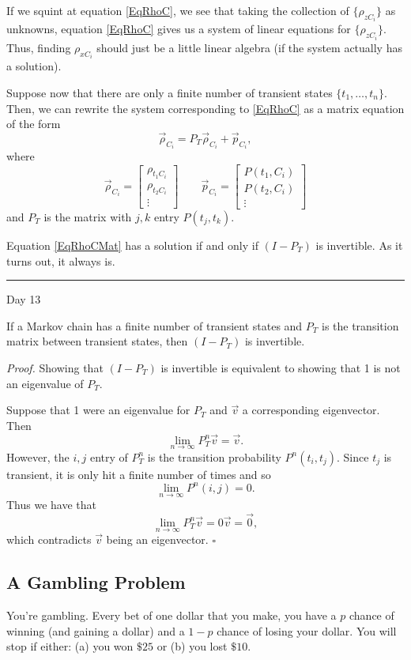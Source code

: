 \documentclass{problemset}
\newcommand{\mat}[1]{\begin{bmatrix}#1\end{bmatrix}}
\newcommand{\1}{\mathbf{1}}
\renewcommand{\P}{\mathbb{P}}
\newcommand{\fatrule}[1]{\vspace{.3cm}\hrule {\hfill \sf #1}\par}
\newenvironment{proof}{\emph{Proof.}}{\hfill$\square$}
\begin{document}
	If we squint at equation \eqref{EqRhoC}, we see that taking the collection of $\{\rho_{zC_i}\}$
	as unknowns, equation \eqref{EqRhoC} gives us a system of linear equations for $\{\rho_{zC_i}\}$.
	Thus, finding $\rho_{xC_i}$ should just be a little linear algebra (if the system actually has a solution).

	Suppose now that there are only a finite number of transient states $\{t_1,\ldots, t_n\}$.  Then, we can rewrite the
	system corresponding to \eqref{EqRhoC} as a matrix equation of the form
	\begin{equation}
		\label{EqRhoCMat}
		\vec \rho_{C_i} = P_T \vec \rho_{C_i} + \vec p_{C_i},
	\end{equation}
	where 
	\[
		\vec \rho_{C_i} = \mat{\rho_{t_1C_i}\\ \rho_{t_2C_i}\\\vdots}
		\qquad \vec p_{C_i} = \mat{P(t_1,C_i)\\P(t_2,C_i)\\\vdots}
	\]
	and $P_T$ is the matrix with $j,k$ entry $P(t_j,t_k)$.

	Equation \eqref{EqRhoCMat} has a solution if and only if $(I-P_T)$ is invertible.  As it turns
	out, it always is.

	\fatrule{Day 13}
	\begin{theorem}
		If a Markov chain has a finite number of transient states and $P_T$ is the transition
		matrix between transient states, then $(I-P_T)$ is invertible.
	\end{theorem}
	\begin{proof}
		Showing that $(I-P_T)$ is invertible is equivalent to showing that 1 is not an
		eigenvalue of $P_T$.

		Suppose that 1 were an eigenvalue for $P_T$ and $\vec v$ a corresponding eigenvector.
		Then
		\[
			\lim_{n\to\infty} P_T^n\vec v = \vec v.
		\]
		However, the $i,j$ entry of $P_T^n$ is the transition probability $P^n(t_i,t_j)$.
		Since $t_j$ is transient, it is only hit a finite number of times and so
		\[
			\lim_{n\to\infty} P^n(i,j) = 0.
		\]
		Thus we have that 
		\[
			\lim_{n\to\infty} P_T^n\vec v = 0\vec v=\vec 0,
		\]
		which contradicts $\vec v$ being an eigenvector.
	\end{proof}


\subsection*{A Gambling Problem}

	You're gambling. Every bet of one dollar that you make, you have a $p$ chance of winning
	(and gaining a dollar) and a $1-p$ chance of losing your dollar.  You will stop if either: (a)
	you won $\$25$ or (b) you lost $\$10$.
\end{document}
